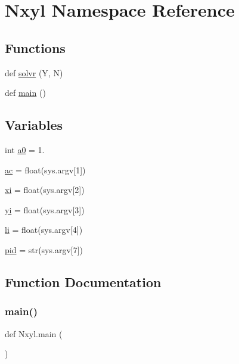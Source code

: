 \hypertarget{namespaceNxyl}{}\section{Nxyl Namespace Reference}
\label{namespaceNxyl}
\subsection*{Functions}
\begin{DoxyCompactItemize}
\item 
def \mbox{\hyperlink{namespaceNxyl_a75efbb5b618196aa19393fc8d9e957a2}{solvr}} (Y, N)
\item 
def \mbox{\hyperlink{namespaceNxyl_a25a5c6712229fa95cea663a03951fd62}{main}} ()
\end{DoxyCompactItemize}
\subsection*{Variables}
\begin{DoxyCompactItemize}
\item 
int \mbox{\hyperlink{namespaceNxyl_a7c7437c14677dc8aa320be903e9f08bb}{a0}} = 1.
\item 
\mbox{\hyperlink{namespaceNxyl_a07413124c3f6a07342b93a1072ba629a}{ac}} = float(sys.\+argv\mbox{[}1\mbox{]})
\item 
\mbox{\hyperlink{namespaceNxyl_a0316033d0531aeb01568ef43bd76910a}{xi}} = float(sys.\+argv\mbox{[}2\mbox{]})
\item 
\mbox{\hyperlink{namespaceNxyl_a732fbc06c15422482e259e67d7baf962}{yi}} = float(sys.\+argv\mbox{[}3\mbox{]})
\item 
\mbox{\hyperlink{namespaceNxyl_a1566bb154870309b9f80ed85001c3833}{li}} = float(sys.\+argv\mbox{[}4\mbox{]})
\item 
\mbox{\hyperlink{namespaceNxyl_abcbdea1a54c46907b34f6738daa3dd0f}{pid}} = str(sys.\+argv\mbox{[}7\mbox{]})
\end{DoxyCompactItemize}


\subsection{Function Documentation}
\mbox{\label{namespaceNxyl_a25a5c6712229fa95cea663a03951fd62}} 
\subsubsection{\texorpdfstring{main()}{main()}}
{\footnotesize\ttfamily def Nxyl.\+main (\begin{DoxyParamCaption}{ }\end{DoxyParamCaption})}

